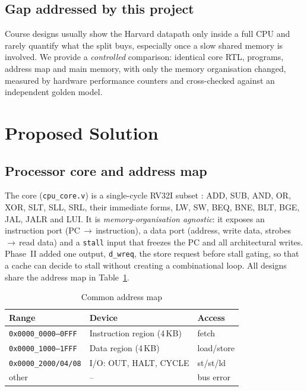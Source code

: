 \documentclass[conference]{IEEEtran}
\begin{document}
\subsection{Gap addressed by this project}
Course designs usually show the Harvard datapath only inside a full CPU and
rarely quantify what the split buys, especially once a slow shared memory is
involved. We provide a \emph{controlled} comparison: identical core RTL,
programs, address map and main memory, with only the memory organisation
changed, measured by hardware performance counters and cross-checked against
an independent golden model.

\section{Proposed Solution}

\subsection{Processor core and address map}
The core (\texttt{cpu\_core.v}) is a single-cycle RV32I subset
\cite{riscv_isa}: ADD, SUB, AND, OR, XOR, SLT, SLL, SRL, their immediate
forms, LW, SW, BEQ, BNE, BLT, BGE, JAL, JALR and LUI. It is
\emph{memory-organisation agnostic}: it exposes an instruction port
(PC\,$\rightarrow$\,instruction), a data port (address, write data, strobes
\,$\rightarrow$\,read data) and a \texttt{stall} input that freezes the PC and
all architectural writes. Phase~II added one output, \texttt{d\_wreq}, the
store request before stall gating, so that a cache can decide to stall
without creating a combinational loop. All designs share the address map in
Table~\ref{tab:map}.

\begin{table}[h]
\caption{Common address map}
\label{tab:map}
\centering
\begin{tabular}{lll}
\toprule
Range & Device & Access \\
\midrule
\texttt{0x0000\_0000--0FFF} & Instruction region (4\,KB) & fetch \\
\texttt{0x0000\_1000--1FFF} & Data region (4\,KB) & load/store \\
\texttt{0x0000\_2000/04/08} & I/O: OUT, HALT, CYCLE & st/st/ld \\
other & -- & bus error \\
\bottomrule
\end{tabular}
\end{table}
\end{document}
